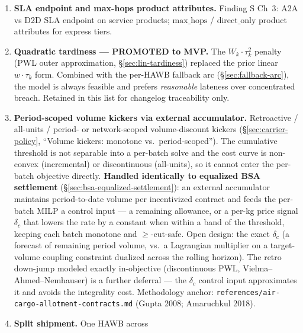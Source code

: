\documentclass[11pt,a4paper]{article}
\theoremstyle{definition}
\begin{document}
\begin{enumerate}
        predicate (express $\Rightarrow$ confirmed-capacity options only).
        Tier 1 air products sell offload priority more than door-to-door
        clock; the MVP catalog doesn't surface this yet.
  \item \label{item:sla-endpoint-and-hops} \textbf{SLA endpoint and max-hops
        product attributes.} Finding S Ch~3: A2A vs D2D SLA endpoint on
        service products; $\text{max\_hops}$ / $\text{direct\_only}$ product
        attributes for express tiers.
  \item \label{item:quadratic-tardiness} \textbf{Quadratic tardiness ---
        PROMOTED to MVP.} The $W_k \cdot \tau_k^2$ penalty (PWL outer
        approximation, \S\ref{sec:lin-tardiness}) replaced the prior linear
        $w \cdot \tau_k$ form. Combined with the per-HAWB fallback arc
        (\S\ref{sec:fallback-arc}), the model is always feasible and
        prefers \emph{reasonable} lateness over concentrated breach. Retained
        in this list for changelog traceability only.
  \item \label{item:volume-kicker-accumulator} \textbf{Period-scoped volume
        kickers via external accumulator.} Retroactive / all-units / period-
        or network-scoped volume-discount kickers (\S\ref{sec:carrier-policy},
        ``Volume kickers: monotone vs.\ period-scoped''). The cumulative
        threshold is not separable into a per-batch solve and the cost curve is
        non-convex (incremental) or discontinuous (all-units), so it cannot
        enter the per-batch objective directly. \textbf{Handled identically to
        equalized BSA settlement} (\S\ref{sec:bsa-equalized-settlement}): an
        external accumulator maintains period-to-date volume per incentivized
        contract and feeds the per-batch MILP a control input --- a remaining
        allowance, or a per-kg price signal $\delta_c$ that lowers the rate by
        a constant when within a band of the threshold, keeping each batch
        monotone and $\geq$-cut-safe. Open design: the exact $\delta_c$ (a
        forecast of remaining period volume, vs.\ a Lagrangian multiplier on a
        target-volume coupling constraint dualized across the rolling horizon).
        The retro down-jump modeled exactly in-objective (discontinuous PWL,
        Vielma--Ahmed--Nemhauser) is a further deferral --- the $\delta_c$
        control input approximates it and avoids the integrality cost.
        Methodology anchor: \texttt{references/air-cargo-allotment-contracts.md}
        (Gupta 2008; Amaruchkul 2018).
  \item \label{item:split-shipment} \textbf{Split shipment.} One HAWB across

\end{enumerate}
\end{document}
